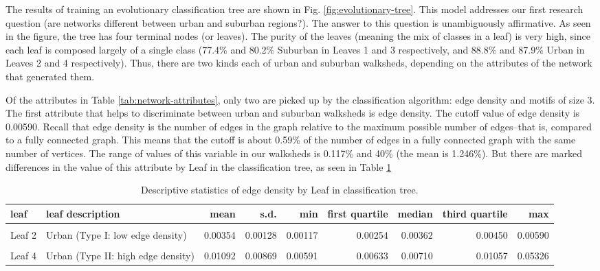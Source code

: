 \documentclass[preprint, 3p,
authoryear]{elsarticle} %
\begin{document}
The results of training an evolutionary classification tree are shown in
Fig. \ref{fig:evolutionary-tree}. This model addresses our first
research question (are networks different between urban and suburban
regions?). The answer to this question is unambiguously affirmative. As
seen in the figure, the tree has four terminal nodes (or leaves). The
purity of the leaves (meaning the mix of classes in a leaf) is very
high, since each leaf is composed largely of a single class (77.4\% and
80.2\% Suburban in Leaves 1 and 3 respectively, and 88.8\% and 87.9\%
Urban in Leaves 2 and 4 respectively). Thus, there are two kinds each of
urban and suburban walksheds, depending on the attributes of the network
that generated them.

Of the attributes in Table \ref{tab:network-attributes}, only two are
picked up by the classification algorithm: edge density and motifs of
size 3. The first attribute that helps to discriminate between urban and
suburban walksheds is edge density. The cutoff value of edge density is
0.00590. Recall that edge density is the number of edges in the graph
relative to the maximum possible number of edges--that is, compared to a
fully connected graph. This means that the cutoff is about 0.59\% of the
number of edges in a fully connected graph with the same number of
vertices. The range of values of this variable in our walksheds is
0.117\% and 40\% (the mean is 1.246\%). But there are marked differences
in the value of this attribute by Leaf in the classification tree, as
seen in Table \ref{tab:skim-of-edge-density}

\begingroup\fontsize{7}{9}\selectfont

\begin{longtable}[t]{llrrrrrrr}
\caption{\label{tab:walkshed-edge-density-by-leaf}\label{tab:skim-of-edge-density}Descriptive statistics of edge density by Leaf in classification tree.}\\
\toprule
leaf & leaf description & mean & s.d. & min & first quartile & median & third quartile & max\\
\midrule
\cellcolor{gray!10}{Leaf 1} & \cellcolor{gray!10}{Suburban (Type I: low edge density)} & \cellcolor{gray!10}{0.00507} & \cellcolor{gray!10}{0.00056} & \cellcolor{gray!10}{0.00323} & \cellcolor{gray!10}{0.00469} & \cellcolor{gray!10}{0.00517} & \cellcolor{gray!10}{0.00550} & \cellcolor{gray!10}{0.00589}\\
Leaf 2 & Urban (Type I: low edge density) & 0.00354 & 0.00128 & 0.00117 & 0.00254 & 0.00362 & 0.00450 & 0.00590\\
\cellcolor{gray!10}{Leaf 3} & \cellcolor{gray!10}{Suburban (Type II: high edge density)} & \cellcolor{gray!10}{0.01654} & \cellcolor{gray!10}{0.02482} & \cellcolor{gray!10}{0.00591} & \cellcolor{gray!10}{0.00757} & \cellcolor{gray!10}{0.01018} & \cellcolor{gray!10}{0.01631} & \cellcolor{gray!10}{0.40000}\\
Leaf 4 & Urban (Type II: high edge density) & 0.01092 & 0.00869 & 0.00591 & 0.00633 & 0.00710 & 0.01057 & 0.05326\\
\bottomrule
\end{longtable}
\endgroup{}
\end{document}
